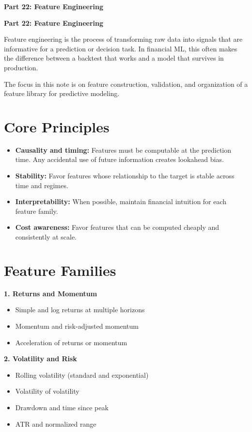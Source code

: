 \documentclass[11pt]{article}
\begin{document}
\begin{center}
{\Large \textbf{Part 22: Feature Engineering}}
\end{center}

\textbf{Part 22: Feature Engineering}

Feature engineering is the process of transforming raw data into signals
that are informative for a prediction or decision task. In financial ML,
this often makes the difference between a backtest that works and a model
that survives in production.

The focus in this note is on feature construction, validation, and
organization of a feature library for predictive modeling.

\section*{Core Principles}

\begin{itemize}[leftmargin=*]
  \item \textbf{Causality and timing:} Features must be computable at the
  prediction time. Any accidental use of future information creates
  lookahead bias.
  \item \textbf{Stability:} Favor features whose relationship to the target
  is stable across time and regimes.
  \item \textbf{Interpretability:} When possible, maintain financial
  intuition for each feature family.
  \item \textbf{Cost awareness:} Favor features that can be computed cheaply
  and consistently at scale.
\end{itemize}

\section*{Feature Families}

\textbf{1. Returns and Momentum}

\begin{itemize}[leftmargin=*]
  \item Simple and log returns at multiple horizons
  \item Momentum and risk-adjusted momentum
  \item Acceleration of returns or momentum
\end{itemize}

\textbf{2. Volatility and Risk}

\begin{itemize}[leftmargin=*]
  \item Rolling volatility (standard and exponential)
  \item Volatility of volatility
  \item Drawdown and time since peak
  \item ATR and normalized range
\end{itemize}
\end{document}
